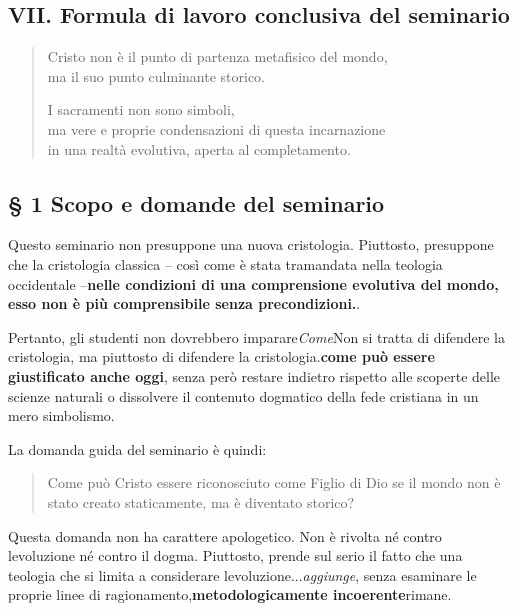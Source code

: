 \documentclass[
]{article}
\begin{document}
\subsection{\texorpdfstring{\textbf{VII. Formula di lavoro conclusiva del seminario}}{VII. Formula di lavoro conclusiva del seminario}}\label{vii.-formula-di-lavoro-conclusiva-del-seminario}

\begin{quote}
Cristo non è il punto di partenza metafisico del mondo,\\
ma il suo punto culminante storico.

I sacramenti non sono simboli,\\
ma vere e proprie condensazioni di questa incarnazione\\
in una realtà evolutiva, aperta al completamento.
\end{quote}

\subsection{\texorpdfstring{\textbf{§ 1 Scopo e domande del seminario}}{§ 1 Scopo e domande del seminario}}\label{scopo-e-domande-del-seminario}

Questo seminario non presuppone una nuova cristologia. Piuttosto, presuppone che la cristologia classica -- così come è stata tramandata nella teologia occidentale --\textbf{nelle condizioni di una comprensione evolutiva del mondo, esso non è più comprensibile senza precondizioni.}.

Pertanto, gli studenti non dovrebbero imparare\emph{Come}Non si tratta di difendere la cristologia, ma piuttosto di difendere la cristologia.\textbf{come può essere giustificato anche oggi}, senza però restare indietro rispetto alle scoperte delle scienze naturali o dissolvere il contenuto dogmatico della fede cristiana in un mero simbolismo.

La domanda guida del seminario è quindi:

\begin{quote}
Come può Cristo essere riconosciuto come Figlio di Dio se il mondo non è stato creato staticamente, ma è diventato storico?
\end{quote}

Questa domanda non ha carattere apologetico. Non è rivolta né contro l\textquotesingle evoluzione né contro il dogma. Piuttosto, prende sul serio il fatto che una teologia che si limita a considerare l\textquotesingle evoluzione...\emph{aggiunge}, senza esaminare le proprie linee di ragionamento,\textbf{metodologicamente incoerente}rimane.
\end{document}

